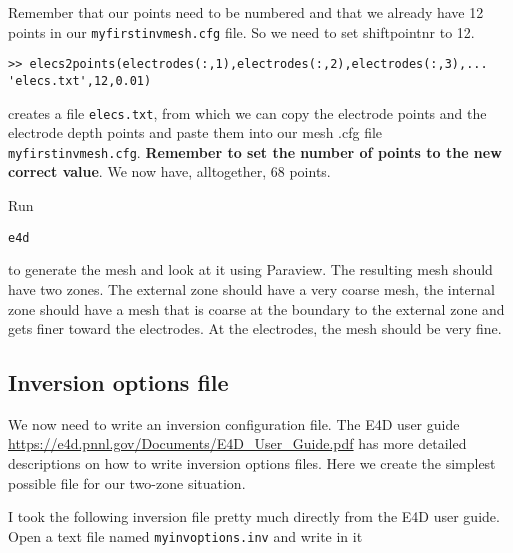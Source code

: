 \documentclass[11pt]{article}
\begin{document}
Remember that our points need to be numbered and that we already have
12 points in our \verb+myfirstinvmesh.cfg+ file. So we need to set
shiftpointnr to 12.

\qquad
\verb+>> elecs2points(electrodes(:,1),electrodes(:,2),electrodes(:,3),...+\\
\hspace{1cm} \verb+'elecs.txt',12,0.01)+

creates a file \verb+elecs.txt+, from which we can copy the electrode
points and the electrode depth points and paste them into our mesh
.cfg file \verb+myfirstinvmesh.cfg+. \textbf{Remember to set the
  number of points to the new correct value}. We now have,
alltogether, 68 points.

Run

\verb+e4d+

to generate the mesh and look at it using Paraview. The resulting mesh
should have two zones. The external zone should have a very coarse
mesh, the internal zone should have a mesh that is coarse at the
boundary to the external zone and gets finer toward the electrodes. At
the electrodes, the mesh should be very fine.

\subsection{Inversion options file}

We now need to write an inversion configuration file. The E4D user
guide \url{https://e4d.pnnl.gov/Documents/E4D_User_Guide.pdf} has
more detailed descriptions on how to write inversion options
files. Here we create the simplest possible file for our two-zone situation.

I took the following inversion file pretty much directly from the E4D user
guide. Open a text file named \verb+myinvoptions.inv+ and write in it

\newpage
\end{document}
